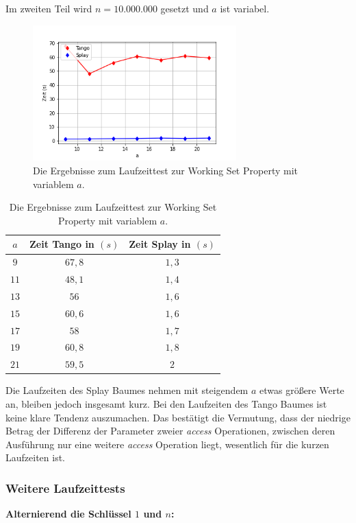 \documentclass[a4paper,12pt]{article}
\begin{document}
\noindent Im zweiten Teil wird $n = 10.000.000$ gesetzt und $a$ ist variabel. 
\begin{figure}[H]
	\centering
	\includegraphics[width=0.7\textwidth]{Medien/laufzeittest/diagramm/workingset2}
	\caption{Die Ergebnisse zum Laufzeittest zur Working Set Property mit variablem $a$.}
\end{figure}
\begin{table}[H]
	\begin{center}
		\begin{tabular}[c]{|c|c|c|}
			\hline
			$a$ & Zeit Tango in $\left(s\right)$ &Zeit Splay in $\left(s\right)$ \\
			\hline
			$9$  & $67,8$ &$1,3$  \\
			\hline
			$11$  & $48,1$ &$1,4$  \\
			\hline
		    $13$  & $56$ &$1,6$  \\
			\hline
			$15$  & $60,6$ &$1,6$  \\
			\hline
			$17$  & $58$ &$1,7$  \\
			\hline
			$19$  & $60,8$ &$1,8$  \\
			\hline
			$21$  & $59,5$ &$2$  \\
			\hline
		\end{tabular}
		\caption{Die Ergebnisse zum Laufzeittest zur Working Set Property mit variablem $a$.} 
	\end{center}
\end{table}


\noindent Die Laufzeiten des Splay Baumes nehmen mit steigendem $a$ etwas größere Werte an, bleiben jedoch insgesamt kurz. Bei den Laufzeiten des Tango Baumes ist keine klare Tendenz auszumachen. Das bestätigt die Vermutung, dass der niedrige Betrag der Differenz der Parameter zweier \textit{access} Operationen, zwischen deren Ausführung nur eine weitere \textit{access} Operation liegt, wesentlich für die kurzen Laufzeiten ist.     
\newpage
\subsubsection{Weitere Laufzeittests}
\noindent \textbf{Alternierend die Schlüssel $1$ und $n$:\\}
\end{document}

